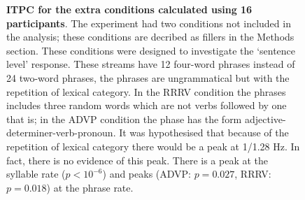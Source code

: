 \documentclass[10pt,letterpaper]{article}
\begin{document}
 \begin{figure}[hp]

\caption{\textbf{ITPC for the extra conditions calculated using 16
    participants}. The experiment had two conditions not included in
  the analysis; these conditions are decribed as fillers in the
  Methods section. These conditions were designed to investigate the
  `sentence level' response. These streams have 12 four-word phrases
  instead of 24 two-word phrases, the phrases are ungrammatical but
  with the repetition of lexical category. In the RRRV condition the
  phrases includes three random words which are not verbs followed by
  one that is; in the ADVP condition the phase has the form
  adjective-determiner-verb-pronoun.  It was hypothesised that because
  of the repetition of lexical category there would be a peak at
  1/1.28 Hz. In fact, there is no evidence of this peak. There is a
  peak at the syllable rate ($p<10^{-6}$) and peaks (ADVP: $p=0.027$,
  RRRV: $p=0.018$) at the phrase rate.}
\label{fig:Fig1}
\end{figure}
\end{document}

